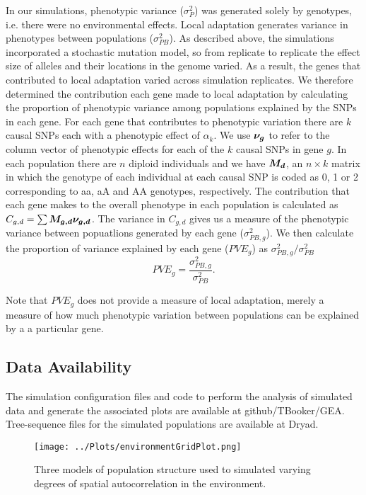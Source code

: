 \documentclass[11pt,twoside,lineno]{GSA_format}
\newcommand{\bm}[1]{\mbox{\boldmath{$#1$}}}
\begin{document}
In our simulations, phenotypic variance ($\sigma^{2}_{P}$) was generated solely by genotypes, i.e. there were no environmental effects. Local adaptation generates variance in phenotypes between populations ($\sigma^{2}_{PB}$). 
As described above, the simulations incorporated a stochastic mutation model, so from replicate to replicate the effect size of alleles and their locations in the genome varied. As a result, the genes that contributed to local adaptation varied across simulation replicates. We therefore determined the contribution  each gene made to local adaptation by calculating the proportion of phenotypic variance among populations explained by the SNPs in each gene. For each gene that contributes to phenotypic variation there are $k$ causal SNPs each with a phenotypic effect of $\alpha_k$. We use $\bm{\nu_g}$ to refer to the column vector of phenotypic effects for each of the $k$ causal SNPs in gene $g$. In each population there are $n$ diploid individuals and we have $\bm{M_d}$, an $n \times k$ matrix in which the genotype of each individual at each causal SNP is coded as 0, 1 or 2 corresponding to aa, aA and AA genotypes, respectively. The contribution that each gene makes to the overall phenotype in each population is calculated as $C_{g,d} = \sum \bm{M_{g,d} \nu_{g,d}}$. The variance in $C_{g,d}$ gives us a measure of the phenotypic variance between popuatlions generated by each gene ($\sigma^{2}_{PB,g}$). We then calculate the proportion of variance explained by each gene ($PVE_g$) as $\sigma^{2}_{PB,g} / \sigma^{2}_{PB}$
\begin{equation}
PVE_g = \frac{\sigma^{2}_{PB,g}}{\sigma^{2}_{PB}}.
\end{equation}

Note that $PVE_g$ does not provide a measure of local adaptation, merely a measure of how much phenotypic variation between populations can be explained by a a particular gene. 

\subsection{Data Availability}

The simulation configuration files and code to perform the analysis of simulated data and generate the associated plots are available at github/TBooker/GEA. Tree-sequence files for the simulated populations are available at Dryad. 


\begin{figure}
  \texttt{[image: ../Plots/environmentGridPlot.png]}
  \caption{Three models of population structure used to simulated varying degrees of spatial autocorrelation in the environment. }
  \label{fig:boat1}
\end{figure}
\end{document}
